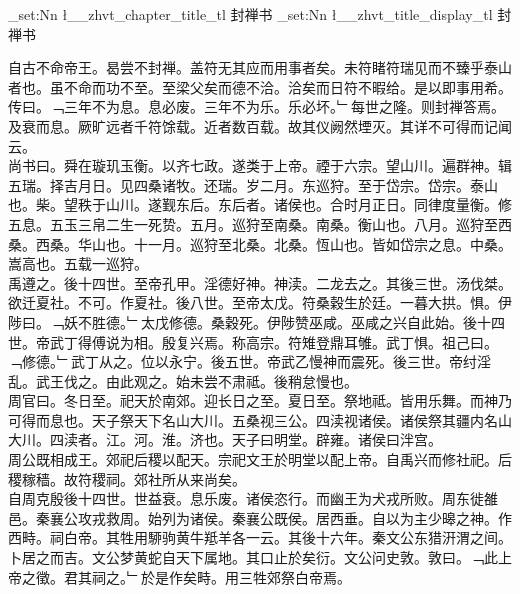 \documentclass{zhvt-classic}
\begin{document}
\clearpage
\ExplSyntaxOn
\tl_set:Nn \l__zhvt_chapter_title_tl { 封禅书 }
\tl_set:Nn \l__zhvt_title_display_tl { 封禅书 }
\ExplSyntaxOff
\maketitle






\hspace*{2em}自古不命帝王。曷尝不封禅。盖符无其应而用事者矣。未符睹符瑞见而不臻乎泰山者也。虽不命而功不至。至梁父矣而德不洽。洽矣而日符不暇给。是以即事用希。传曰。﹁三年不为息。息必废。三年不为乐。乐必坏。﹂每世之隆。则封禅答焉。及衰而息。厥旷远者千符馀载。近者数百载。故其仪阙然堙灭。其详不可得而记闻云。\\
\hspace*{2em}尚书曰。舜在璇玑玉衡。以齐七政。遂类于上帝。禋于六宗。望山川。遍群神。辑五瑞。择吉月日。见四桑诸牧。还瑞。岁二月。东巡狩。至于岱宗。岱宗。泰山也。柴。望秩于山川。遂觐东后。东后者。诸侯也。合时月正日。同律度量衡。修五息。五玉三帛二生一死贽。五月。巡狩至南桑。南桑。衡山也。八月。巡狩至西桑。西桑。华山也。十一月。巡狩至北桑。北桑。恆山也。皆如岱宗之息。中桑。嵩高也。五载一巡狩。\\
\hspace*{2em}禹遵之。後十四世。至帝孔甲。淫德好神。神渎。二龙去之。其後三世。汤伐桀。欲迁夏社。不可。作夏社。後八世。至帝太戊。符桑穀生於廷。一暮大拱。惧。伊陟曰。﹁妖不胜德。﹂太戊修德。桑穀死。伊陟赞巫咸。巫咸之兴自此始。後十四世。帝武丁得傅说为相。殷复兴焉。称高宗。符雉登鼎耳雊。武丁惧。祖己曰。﹁修德。﹂武丁从之。位以永宁。後五世。帝武乙慢神而震死。後三世。帝纣淫乱。武王伐之。由此观之。始未尝不肃祗。後稍怠慢也。\\
\hspace*{2em}周官曰。冬日至。祀天於南郊。迎长日之至。夏日至。祭地祗。皆用乐舞。而神乃可得而息也。天子祭天下名山大川。五桑视三公。四渎视诸侯。诸侯祭其疆内名山大川。四渎者。江。河。淮。济也。天子曰明堂。辟雍。诸侯曰泮宫。\\
\hspace*{2em}周公既相成王。郊祀后稷以配天。宗祀文王於明堂以配上帝。自禹兴而修社祀。后稷稼穑。故符稷祠。郊社所从来尚矣。\\
\hspace*{2em}自周克殷後十四世。世益衰。息乐废。诸侯恣行。而幽王为犬戎所败。周东徙雒邑。秦襄公攻戎救周。始列为诸侯。秦襄公既侯。居西垂。自以为主少暤之神。作西畤。祠白帝。其牲用駵驹黄牛羝羊各一云。其後十六年。秦文公东猎汧渭之间。卜居之而吉。文公梦黄蛇自天下属地。其口止於矣衍。文公问史敦。敦曰。﹁此上帝之徵。君其祠之。﹂於是作矣畤。用三牲郊祭白帝焉。\\
\end{document}
